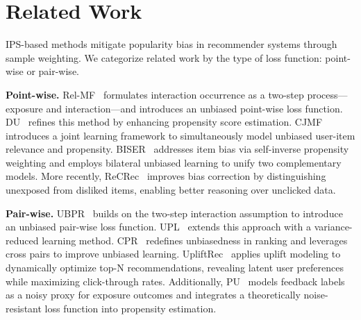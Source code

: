 \section{Related Work}
\label{sec:dnm9}
IPS-based methods mitigate popularity bias in recommender systems through sample weighting.
We categorize related work by the type of loss function: point-wise or pair-wise.

\textbf{Point-wise.}
Rel-MF~\cite{saito2020unbiased} formulates interaction occurrence as a two-step process---exposure and interaction---and introduces an unbiased point-wise loss function.
DU~\cite{lee2021dual} refines this method by enhancing propensity score estimation.
CJMF~\cite{zhu2020unbiased} introduces a joint learning framework to simultaneously model unbiased user-item relevance and propensity.
BISER~\cite{lee2022bilateral} addresses item bias via self-inverse propensity weighting and employs bilateral unbiased learning to unify two complementary models.
More recently, ReCRec~\cite{lin2024recrec} improves bias correction by distinguishing unexposed from disliked items, enabling better reasoning over unclicked data.

\textbf{Pair-wise.}
UBPR~\cite{saito2020unbiased2} builds on the two-step interaction assumption to introduce an unbiased pair-wise loss function.
UPL~\cite{ren2023unbiased} extends this approach with a variance-reduced learning method.
CPR~\cite{wan2022cross} redefines unbiasedness in ranking and leverages cross pairs to improve unbiased learning.
UpliftRec~\cite{chen2024treatment} applies uplift modeling to dynamically optimize top-N recommendations, revealing latent user preferences while maximizing click-through rates.
Additionally, PU~\cite{cao2024practically} models feedback labels as a noisy proxy for exposure outcomes and integrates a theoretically noise-resistant loss function into propensity estimation.